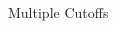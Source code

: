 \documentclass[notes,11pt, aspectratio=169]{beamer}
\begin{document}
\begin{frame}{Multiple Cutoffs}
\begin{columns}[onlytextwidth, T]
\begin{column}{.4\textwidth}
      \end{column}%
    \end{columns}
\end{frame}
\end{document}
